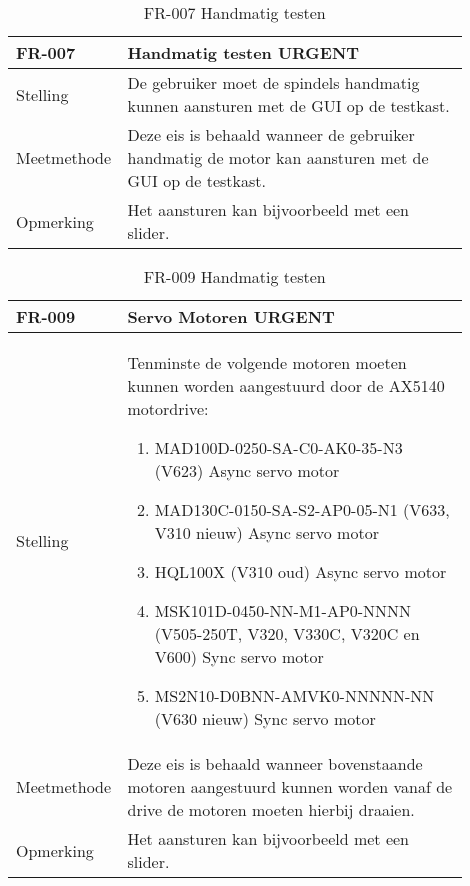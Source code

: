 \newpage

\begin{table}[ht]
	\caption{FR-007 Handmatig testen}
	\label{tab:FR-007}
	\centering
	\begin{tabular}{|p{0.15\linewidth}|p{0.75\linewidth}|}
		\hline
		FR-007 & Handmatig testen URGENT \\
		
		\hline
		
		Stelling & De gebruiker moet de spindels handmatig kunnen aansturen met de GUI op de testkast. \\
		
		Meetmethode & Deze eis is behaald wanneer de gebruiker handmatig de motor kan aansturen met de GUI op de testkast. \\
		
		Opmerking & Het aansturen kan bijvoorbeeld met een slider. \\
		\hline
	\end{tabular}
\end{table}

\newpage

\begin{table}[ht]
	\caption{FR-009 Handmatig testen}
	\label{tab:FR-009}
	\centering
	\begin{tabular}{|p{0.15\linewidth}|p{0.75\linewidth}|}
		\hline
		FR-009 & Servo Motoren URGENT \\
		
		\hline
		
		Stelling & Tenminste de volgende motoren moeten kunnen worden aangestuurd door de AX5140 motordrive:
		\begin{enumerate}
			\item MAD100D-0250-SA-C0-AK0-35-N3 (V623) Async servo motor
			\item MAD130C-0150-SA-S2-AP0-05-N1 (V633, V310 nieuw) Async servo motor
			\item HQL100X (V310 oud) Async servo motor
			\item MSK101D-0450-NN-M1-AP0-NNNN (V505-250T, V320, V330C, V320C en V600) Sync servo motor
			\item MS2N10-D0BNN-AMVK0-NNNNN-NN (V630 nieuw)  Sync servo motor
		\end{enumerate} \\
		
		Meetmethode & Deze eis is behaald wanneer bovenstaande motoren aangestuurd kunnen worden vanaf de drive de motoren moeten hierbij draaien. \\
		
		Opmerking & Het aansturen kan bijvoorbeeld met een slider. \\
		\hline
	\end{tabular}
\end{table}

